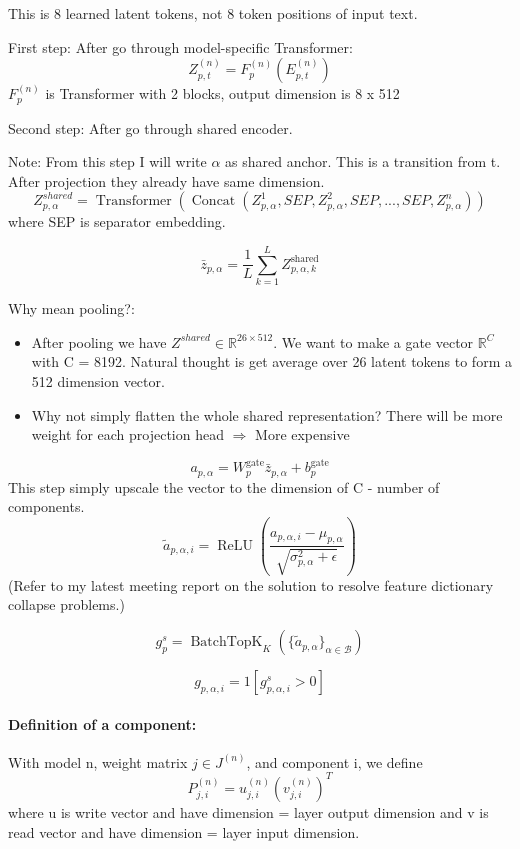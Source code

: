 \documentclass[11pt,a4paper]{article}
\newcommand{\RR}{\mathbb{R}}
\begin{document}
This is 8 learned latent tokens, not 8 token positions of input text.

First step: After go through model-specific Transformer:
$$
Z_{p,t}^{(n)} = F_p^{(n)}(E^{(n)}_{p,t})
$$
$F_p^{(n)}$ is Transformer with 2 blocks, output dimension is 8 x 512

Second step: After go through shared encoder.

Note: From this step I will write $\alpha$ as shared anchor. This is a transition from t. After projection they already have same dimension.
$$
Z_{p,\alpha}^{shared} = \operatorname{Transformer}(\operatorname{Concat}(Z_{p,\alpha}^1, SEP, Z_{p,\alpha}^2, SEP, ..., SEP, Z_{p,\alpha}^n))
$$ where SEP is separator embedding.

$$
\bar z_{p,\alpha}
=
\frac{1}{L}
\sum_{k=1}^{L}
Z_{p,\alpha,k}^{\mathrm{shared}}
$$

Why mean pooling?:
\begin{itemize}
\item After pooling we have $Z^{shared} \in \RR^{26\times512}$. We want to make a gate vector $\RR^C$ with C = 8192. Natural thought is get average over 26 latent tokens to form a 512 dimension vector.
\item Why not simply flatten the whole shared representation? There will be more weight for each projection head $\Rightarrow$ More expensive
\end{itemize}

$$
a_{p,\alpha}
=
W_p^{\mathrm{gate}}\bar z_{p,\alpha}
+b_p^{\mathrm{gate}}
$$
This step simply upscale the vector to the dimension of C - number of components.
$$
\tilde a_{p,\alpha,i}
=
\operatorname{ReLU}\left(
\frac{a_{p,\alpha,i}-\mu_{p,\alpha}}
{\sqrt{\sigma_{p,\alpha}^2+\epsilon}}
\right)
$$
(Refer to my latest meeting report on the solution to resolve feature dictionary collapse problems.)

$$
g_p^s
=
\operatorname{BatchTopK}_K
\left(
\{\tilde a_{p,\alpha}\}_{\alpha\in\mathcal B}
\right)
$$

$$
g_{p,\alpha,i}
=
1[g_{p,\alpha,i}^s>0]
$$

\paragraph{Definition of a component:} With model n, weight matrix $j \in J^{(n)}$, and component i, we define
$$
P_{j,i}^{(n)} = u^{(n)}_{j,i} (v_{j,i}^{(n)})^T
$$ where u is write vector and have dimension = layer output dimension and v is read vector and have dimension = layer input dimension.
\end{document}
